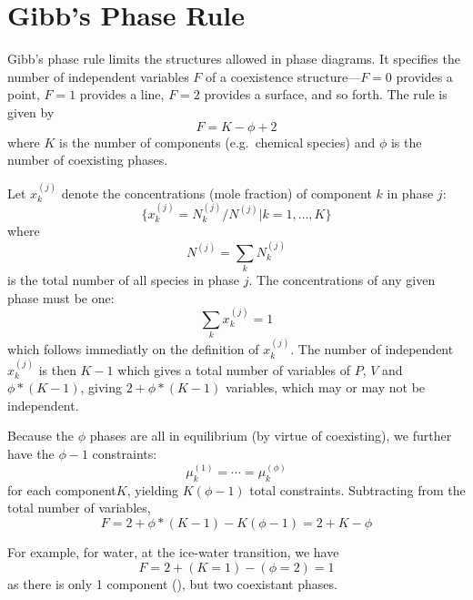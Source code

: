 \section{Gibb's Phase Rule}
Gibb's phase rule limits the structures allowed in phase diagrams. It specifies the number  of independent variables  \(F\) of a coexistence structure---\(F=0\) provides a point, \(F=1\) provides a line, \(F=2\) provides a surface, and so forth. The rule is given by
\begin{equation}
	F = K - \phi + 2
\end{equation}
where \(K\) is the number of components (e.g.\ chemical species) and \(\phi\) is the number of coexisting phases.

Let \(x_k^{(j)}\) denote the concentrations (mole fraction) of component \(k\) in phase \(j\):
\[\{x_k^{(j)}=N_k^{(j)}/N^{(j)} \vert k=1,\ldots,K\}\]
where
\[N^{(j)}=\sum_kN_k^{(j)}\]
is the total number of all species in phase \(j\). The concentrations of any given phase must be one:
\begin{equation}
	\sum_kx_k^{(j)}=1
\end{equation}
which follows immediatly on the definition of \(x_k^{(j)}\). The number of independent \(x_k^{(j)}\) is then \(K-1\) which gives a total number of variables of \(P\), \(V\) and \(\phi *(K-1)\), giving
\(2+\phi*(K-1)\) variables, which may or may not be independent.

Because the \(\phi\) phases are all in equilibrium (by virtue of coexisting), we further have the \(\phi-1\) constraints:
\[\mu_k^{(1)}=\cdots=\mu_k^{(\phi)}\]
for each component\(K\), yielding \(K(\phi-1)\) total constraints. Subtracting from the total number of variables,
\[F=2+\phi*(K-1)-K(\phi-1)=2+K-\phi\]

For example, for water, at the ice-water transition, we have 
\[F=2+(K=1)-(\phi=2)=1\]
as there is only 1 component (), but two coexistant phases.


